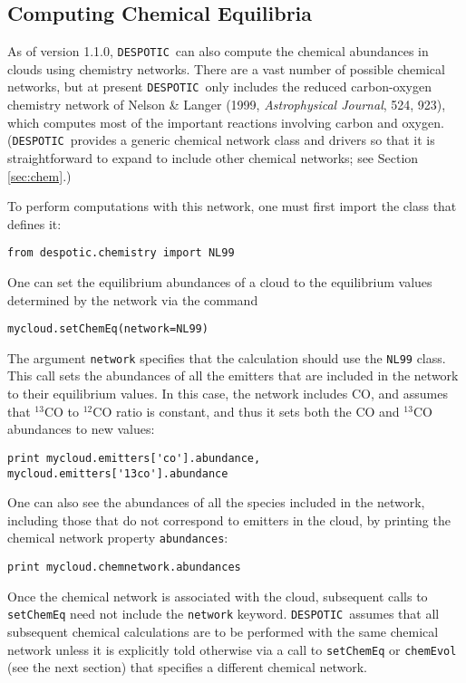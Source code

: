 \documentclass[12pt]{article}
\newcommand{\despotic}{\texttt{DESPOTIC}}
\begin{document}
\subsection{Computing Chemical Equilibria}

As of version 1.1.0, \despotic\ can also compute the chemical abundances in clouds using chemistry networks. There are a vast number of possible chemical networks, but at present \despotic\ only includes the reduced carbon-oxygen chemistry network of Nelson \& Langer (1999, \textit{Astrophysical Journal}, 524, 923), which computes most of the important reactions involving carbon and oxygen. (\despotic\ provides a generic chemical network class and drivers so that it is straightforward to expand to include other chemical networks; see Section \ref{sec:chem}.)

To perform computations with this network, one must first import the class that defines it:
\begin{verbatim}
from despotic.chemistry import NL99
\end{verbatim}
One can set the equilibrium abundances of a cloud to the equilibrium values determined by the network via the command
\begin{verbatim}
mycloud.setChemEq(network=NL99)
\end{verbatim}
The argument \verb=network= specifies that the calculation should use the \verb=NL99= class. This call sets the abundances of all the emitters that are included in the network to their equilibrium values. In this case, the network includes CO, and assumes that $^{13}$CO to $^{12}$CO ratio is constant, and thus it sets both the CO and $^{13}$CO abundances to new values:
\begin{verbatim}
print mycloud.emitters['co'].abundance, mycloud.emitters['13co'].abundance
\end{verbatim}

One can also see the abundances of all the species included in the network, including those that do not correspond to emitters in the cloud, by printing the chemical network property \verb=abundances=:
\begin{verbatim}
print mycloud.chemnetwork.abundances
\end{verbatim}
Once the chemical network is associated with the cloud, subsequent calls to \verb=setChemEq= need not include the \verb=network= keyword. \despotic\ assumes that all subsequent chemical calculations are to be performed with the same chemical network unless it is explicitly told otherwise via a call to \verb=setChemEq= or \verb=chemEvol= (see the next section) that specifies a different chemical network.
\end{document}
